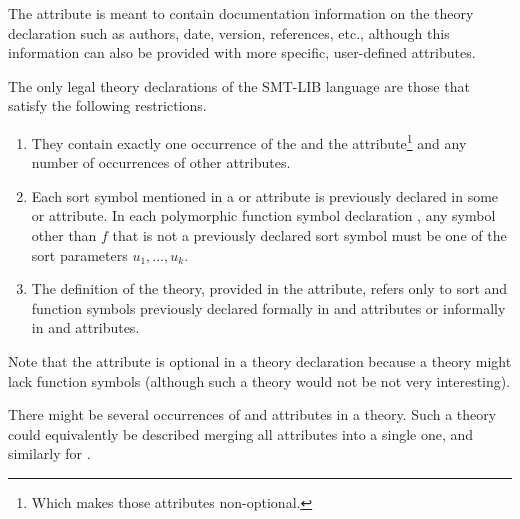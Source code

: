 The attribute  is meant 
to contain documentation information on the theory declaration 
such as authors, date, version, references, etc.,
although this information can also be provided 
with more specific, user-defined attributes.

\begin{constraint}
\label{def:theory}
The only legal theory declarations of the SMT-LIB language are those 
that satisfy the following restrictions.
\begin{enumerate}
\item
They contain exactly one occurrence of the  and 
the  attribute\footnote{%
Which makes those attributes non-optional.
}
and any number of occurrences of other attributes.

\item
Each sort symbol mentioned in a  or  attribute is 
previously declared in some  or  attribute.
In each polymorphic function symbol declaration
,
any symbol other than $f$ that is not a previously declared sort symbol
must be one of the sort parameters $u_1, \ldots, u_k$. 

\item
The definition of the theory, provided in the  attribute,
refers only to sort and function symbols previously declared formally
in  and  attributes or 
informally in  and  attributes.

\end{enumerate}
\end{constraint}

Note that the  attribute is optional in a theory declaration
because a theory might lack function symbols (although 
such a theory would not be not very interesting).

There might be several occurrences of  and  attributes in a theory.  Such a theory could equivalently be described merging all   attributes into a single one, and similarly for .

